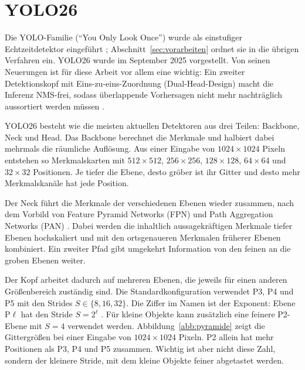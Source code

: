 \section{YOLO26}
\label{sec:yolo26}

 Die YOLO-Familie (\enquote{You Only Look Once}) wurde als
einstufiger Echtzeitdetektor eingeführt \parencite{redmon2016};
Abschnitt~\ref{sec:vorarbeiten} ordnet sie in die übrigen Verfahren ein. YOLO26
wurde im September 2025 vorgestellt. Von seinen Neuerungen ist für diese Arbeit
vor allem eine wichtig: Ein zweiter Detektionskopf mit Eins-zu-eins-Zuordnung
(Dual-Head-Design) macht die Inferenz NMS-frei, sodass überlappende Vorhersagen
nicht mehr nachträglich aussortiert werden müssen
\parencite{jocher2026yolo26,sapkota2025}.

\label{sec:neck} YOLO26 besteht wie die meisten aktuellen
Detektoren aus drei Teilen: Backbone, Neck und Head. Das Backbone berechnet die
Merkmale und halbiert dabei mehrmals die räumliche Auflösung. Aus einer Eingabe
von $1024\times1024$ Pixeln entstehen so Merkmalskarten mit $512\times512$,
$256\times256$, $128\times128$, $64\times64$ und $32\times32$ Positionen. Je
tiefer die Ebene, desto gröber ist ihr Gitter und desto mehr Merkmalskanäle hat
jede Position.

Der Neck führt die Merkmale der verschiedenen Ebenen wieder zusammen, nach dem
Vorbild von Feature Pyramid Networks (FPN) \parencite{lin2017fpn} und Path
Aggregation Networks (PAN) \parencite{liu2018panet}. Dabei werden die inhaltlich aussagekräftigen Merkmale
tiefer Ebenen hochskaliert und mit den ortsgenaueren Merkmalen früherer Ebenen
kombiniert. Ein zweiter Pfad gibt umgekehrt Information von den feinen an die
groben Ebenen weiter.

Der Kopf arbeitet dadurch auf mehreren Ebenen, die jeweils für einen anderen
Größenbereich zuständig sind. Die Standardkonfiguration verwendet P3, P4 und P5
mit den Strides $S\in\{8,16,32\}$. Die Ziffer im Namen ist der
Exponent: Ebene P$\ell$ hat den Stride $S=2^{\ell}$
\parencite{lin2017fpn}. Für kleine Objekte kann zusätzlich eine feinere
P2-Ebene mit $S=4$ verwendet werden. Abbildung~\ref{abb:pyramide} zeigt die
Gittergrößen bei einer Eingabe von $1024\times1024$ Pixeln. P2 allein hat mehr
Positionen als P3, P4 und P5 zusammen. Wichtig ist aber nicht diese Zahl,
sondern der kleinere Stride, mit dem kleine Objekte feiner abgetastet werden.

